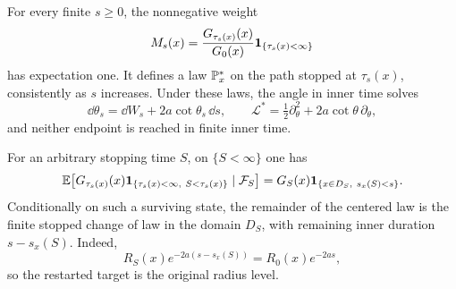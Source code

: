 \begin{lemma}\label{op:finite-tilt}
For every finite $s\ge0$, the nonnegative weight
\begin{equation}
 M_s(x)=\frac{G_{\tau_s(x)}(x)}{G_0(x)}
                 \mathbf 1_{\{\tau_s(x)<\infty\}}
 \label{op:finite-density}
\end{equation}
has expectation one. It defines a law $\mathbb P_x^*$ on the path stopped at
$\tau_s(x)$, consistently as $s$ increases. Under these laws, the angle
in inner time solves
\begin{equation}
 \dd\theta_s=\dd W_s+2a\cot\theta_s\,\dd s,
 \qquad
 \mathcal L^*=\tfrac12\partial_\theta^2
                       +2a\cot\theta\,\partial_\theta,
 \label{op:tilted-angle}
\end{equation}
and neither endpoint is reached in finite inner time.

For an arbitrary stopping time $S$, on $\{S<\infty\}$ one has
\begin{equation}
 \mathbb E\!\left[G_{\tau_s(x)}(x)
       \mathbf 1_{\{\tau_s(x)<\infty,\ S<\tau_s(x)\}}
                  \mid\mathcal F_S\right]
 =G_S(x)\mathbf 1_{\{x\in D_S,\ s_x(S)<s\}}.
 \label{op:conditional-weight}
\end{equation}
Conditionally on such a surviving state, the remainder of the centered
law is the finite stopped change of law in the domain $D_S$, with
remaining inner duration $s-s_x(S)$. Indeed,
\[
 R_S(x)e^{-2a(s-s_x(S))}=R_0(x)e^{-2as},
\]
so the restarted target is the original radius level.
\end{lemma}

